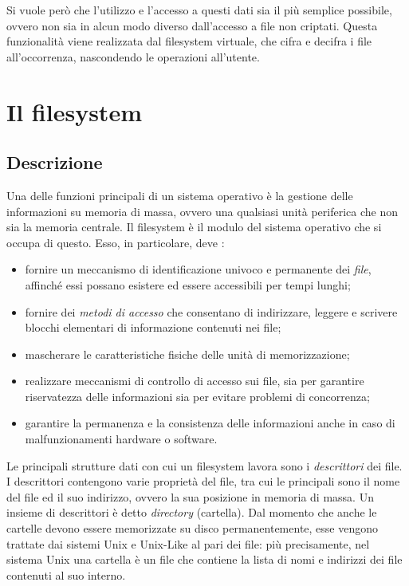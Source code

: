 \documentclass[a4paper,12pt,twoside,openright]{report}
\begin{document}
  Si vuole però che l'utilizzo e l'accesso a questi dati sia il più semplice possibile, ovvero non sia
  in alcun modo diverso dall'accesso a file non criptati.
  Questa funzionalità viene realizzata dal filesystem virtuale, che cifra
  e decifra i file all'occorrenza, nascondendo le operazioni all'utente.

  \section{Il filesystem}

  \label{filesystem-descrizione}
  \subsection{Descrizione}

  Una delle funzioni principali di un sistema operativo è la gestione delle informazioni su
  memoria di massa, ovvero una qualsiasi unità periferica che non sia la memoria centrale.
  Il filesystem è il modulo del sistema operativo che si occupa di questo. Esso, in particolare,
  deve \cite{sistemioperativi}:

  \begin{itemize}
    \item fornire un meccanismo di identificazione univoco e permanente dei \textit{file}, affinché essi possano
          esistere ed essere accessibili per tempi lunghi;
    \item fornire dei \textit{metodi di accesso} che consentano di indirizzare, leggere e scrivere blocchi
          elementari di informazione contenuti nei file;
    \item mascherare le caratteristiche fisiche delle unità di memorizzazione;
    \item realizzare meccanismi di controllo di accesso sui file, sia per garantire riservatezza delle informazioni
          sia per evitare problemi di concorrenza;
    \item garantire la permanenza e la consistenza delle informazioni anche in caso di malfunzionamenti hardware o software.
  \end{itemize}

  Le principali strutture dati con cui un filesystem lavora sono i \textit{descrittori} dei file.
  I descrittori contengono varie proprietà del file, tra cui le principali sono il nome del file ed
  il suo indirizzo, ovvero la sua posizione in memoria di massa.
  Un insieme di descrittori è detto \textit{directory} (cartella). Dal momento che anche le cartelle devono
  essere memorizzate su disco permanentemente, esse vengono trattate dai sistemi Unix e Unix-Like
  al pari dei file: più precisamente, nel sistema Unix una cartella è un file che contiene la lista di nomi
  e indirizzi dei file contenuti al suo interno.
\end{document}
